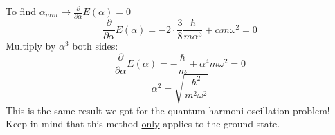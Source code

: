 To find $\alpha_{min}\rightarrow\frac{\partial}{\partial \alpha}E(\alpha)=0$
\[
\frac{\partial}{\partial \alpha}E(\alpha)=-2\cdot\frac{3}{8}\frac{\hbar}{m\alpha^{3}}+\alpha m\omega^2=0
\]
Multiply by $\alpha^3$ both sides:
\[
\frac{\partial}{\partial \alpha}E(\alpha)=-\frac{\hbar}{m}+\alpha^4m\omega^2=0
\]
\[
\alpha^2=\sqrt{\frac{\hbar^2}{m^2\omega^2}}
\]
This is the same result we got for the quantum harmoni oscillation problem! Keep in mind that this method \underline{only} applies to the ground state.
